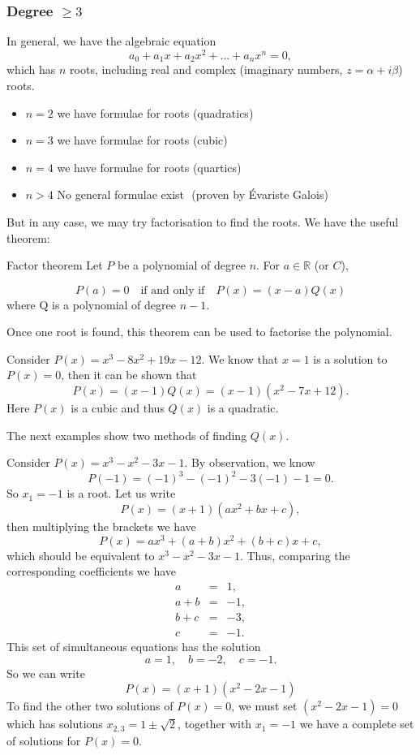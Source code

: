 \subsubsection{Degree $\ge 3$}

In general, we have the algebraic equation
\begin{equation}
a_0+a_1x+a_2x^2 + \dots + a_nx^n = 0,
\end{equation}
which has $n$ roots, including real and complex (imaginary numbers, $z=\alpha + i\beta$) roots.
\begin{itemize}
\item[] $n=2$ \quad we have formulae for roots \quad (quadratics)
\item[] $n=3$ \quad we have formulae for roots \quad (cubic)
\item[] $n=4$ \quad we have formulae for roots \quad (quartics)
\item[] $n>4$ \quad No general formulae exist  \,\,\quad (proven by \'{E}variste Galois)
\end{itemize}
But in any case, we may try factorisation to find the roots. We have the useful theorem:

\begin{theorem}{Factor theorem}
Let \(P\) be a polynomial of degree \(n\). For \(a\in\mathbb{R}\) (or \(C\)),\par
$$P(a) = 0\quad \text{if and only if}\quad P(x)=(x-a)Q(x)$$
where Q is a polynomial of degree \(n-1\).

\end{theorem}

Once one root is found, this theorem can be used to factorise the polynomial.
\begin{example} 
Consider $P(x)=x^3-8x^2+19x-12$. We know that $x=1$ is a solution to $P(x)=0$, then it can be shown that
\begin{equation*}
P(x)=(x-1)Q(x)=(x-1)(x^2-7x+12).
\end{equation*}
Here $P(x)$ is a cubic and thus $Q(x)$ is a quadratic.
\end{example}

The next examples show two methods of finding \(Q(x)\).
\begin{example}
Consider $P(x)=x^3-x^2-3x-1$. By observation, we know 
\[P(-1)=(-1)^3-(-1)^2-3(-1)-1=0.\]
So $x_1=-1$ is a root. Let us write
\[P(x)=(x+1)(ax^2+bx+c),\]
then multiplying the brackets we have
\[P(x)=ax^3+(a+b)x^2 + (b+c)x +c,\]
which should be equivalent to $x^3-x^2-3x-1$. Thus, comparing the corresponding coefficients we have
\begin{eqnarray*}
a &=& 1, \\
a+b &=& -1,  \\
b+c &=& -3,  \\
c &=& -1.
\end{eqnarray*}
This set of simultaneous equations has the solution
\[a=1,\quad b=-2,\quad c=-1.\]
So we can write
\[P(x)=(x+1)(x^2-2x-1)\]
To find the other two solutions of $P(x)=0$, we must set $(x^2-2x-1)=0$ which has solutions $x_{2,3}=1\pm\sqrt{2}$, together with $x_1=-1$ we have a complete set of solutions for $P(x)=0$.
\end{example}

